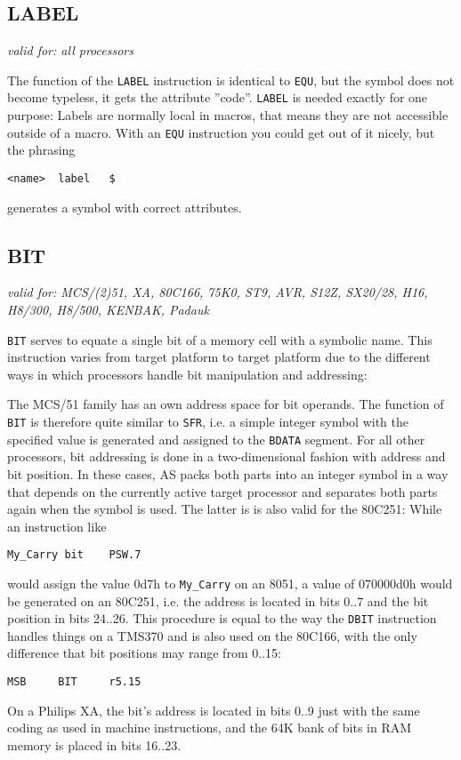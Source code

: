 \documentclass[12pt,twoside]{report}
\makeatletter
\newcommand{\tty}[1]{{\tt #1}}
\newcommand{\ttindex}[1]{\index{#1@{\tt #1}}}
\newcommand{\asname}{{AS}}
\makeatother
\begin{document}
\subsection{LABEL}
\ttindex{LABEL}

{\em valid for: all processors}

The function of the \tty{LABEL} instruction is identical to \tty{EQU}, but
the symbol does not become typeless, it gets the attribute ''code''.
\tty{LABEL} is needed exactly for one purpose: Labels are normally local
in macros, that means they are not accessible outside of a macro.  With an
\tty{EQU} instruction you could get out of it nicely, but the phrasing
\begin{verbatim}
<name>  label   $
\end{verbatim}
generates a symbol with correct attributes.


\subsection{BIT}
\ttindex{BIT}

{\em valid for: MCS/(2)51, XA, 80C166, 75K0, ST9, AVR, S12Z, SX20/28, H16,
                H8/300, H8/500, KENBAK, Padauk}

\tty{BIT} serves to equate a single bit of a memory cell with a symbolic
name.  This instruction varies from target platform to target platform due
to the different ways in which processors handle bit manipulation and
addressing:

The MCS/51 family has an own address space for bit operands.  The function
of \tty{BIT} is therefore quite similar to \tty{SFR}, i.e. a simple integer
symbol with the specified value is generated and assigned to the
\tty{BDATA} segment.  For all other processors, bit addressing is done in
a two-dimensional fashion with address and bit position.  In these cases,
\asname{} packs both parts into an integer symbol in a way that depends on the
currently active target processor and separates both parts again when the
symbol is used.  The latter is is also valid for the 80C251: While an
instruction like
\begin{verbatim}
My_Carry bit    PSW.7
\end{verbatim}
would assign the value 0d7h to \tty{My\_Carry} on an 8051, a value of
070000d0h would be generated on an 80C251, i.e. the address is located in
bits 0..7 and the bit position in bits 24..26.  This procedure is equal to
the way the \tty{DBIT} instruction handles things on a TMS370 and is also
used on the 80C166, with the only difference that bit positions may range
from 0..15:
\begin{verbatim}
MSB     BIT     r5.15
\end{verbatim}
On a Philips XA, the bit's address is located in bits 0..9 just with
the same coding as used in machine instructions, and the 64K bank of
bits in RAM memory is placed in bits 16..23.
\end{document}
